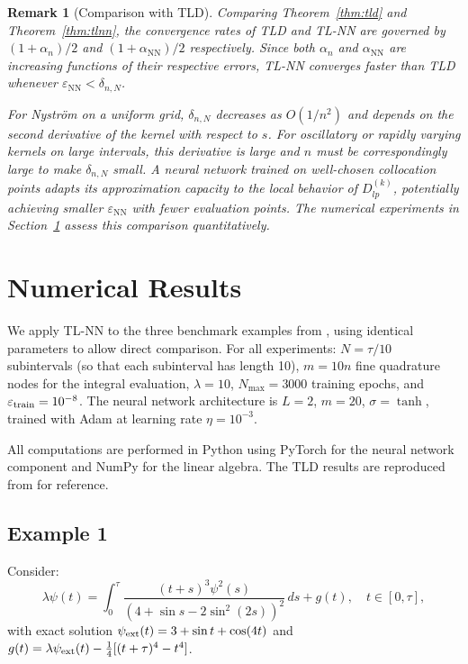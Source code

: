 \documentclass[12pt, a4paper]{article}
\newtheorem{remark}[theorem]{Remark}
\newcommand{\epsNN}{\varepsilon_{\mathrm{NN}}}
\newcommand{\alphNN}{\alpha_{\mathrm{NN}}}
\begin{document}
\begin{remark}[Comparison with TLD]
  Comparing Theorem~\ref{thm:tld} and Theorem~\ref{thm:tlnn},
  the convergence rates of TLD and TL-NN are governed by
  $(1+\alpha_n)/2$ and $(1+\alphNN)/2$ respectively.
  Since both $\alpha_n$ and $\alphNN$ are increasing
  functions of their respective errors, TL-NN converges
  faster than TLD whenever $\epsNN < \delta_{n,N}$.
  
  For Nystr\"{o}m on a uniform grid, $\delta_{n,N}$ decreases
  as $O(1/n^2)$ and depends on the second derivative of the
  kernel with respect to $s$.
  For oscillatory or rapidly varying kernels on large
  intervals, this derivative is large and $n$ must be
  correspondingly large to make $\delta_{n,N}$ small.
  A neural network trained on well-chosen collocation points
  adapts its approximation capacity to the local behavior of
  $D_{lp}^{(k)}$, potentially achieving smaller $\epsNN$
  with fewer evaluation points.
  The numerical experiments in Section~\ref{sec:numerics}
  assess this comparison quantitatively.
\end{remark}

\section{Numerical Results}
\label{sec:numerics}

We apply TL-NN to the three benchmark examples from
\cite{sedka2025}, using identical parameters to allow
direct comparison.
For all experiments: $N = \tau/10$ subintervals (so that
each subinterval has length 10), $m = 10n$ fine quadrature
nodes for the integral evaluation, $\lambda = 10$,
$N_{\max} = 3000$ training epochs, and
$\varepsilon_{\rm train} = 10^{-8}$.
The neural network architecture is $L=2$, $m=20$, $\sigma
= \tanh$, trained with Adam at learning rate $\eta = 10^{-3}$.

All computations are performed in Python using PyTorch for
the neural network component and NumPy for the linear algebra.
The TLD results are reproduced from \cite{sedka2025} for
reference.

\subsection{Example 1}

Consider:
\begin{equation}
  \lambda\psi(t) = \int_0^\tau
  \frac{(t+s)^3 \psi^2(s)}{(4 + \sin s - 2\sin^2(2s))^2}
  \, ds + g(t),
  \quad t \in [0, \tau],
  \label{eq:ex1}
\end{equation}
with exact solution $\psi_{\rm ext}(t) = 3 + \sin t + \cos(4t)$
and $g(t) = \lambda \psi_{\rm ext}(t) - \frac{1}{4}
[(t+\tau)^4 - t^4]$.
\end{document}
